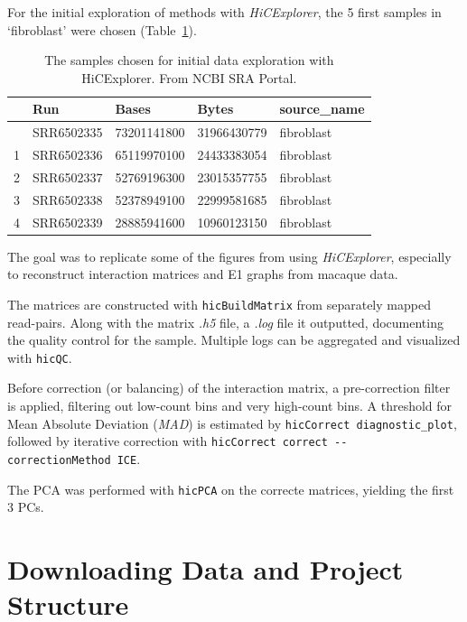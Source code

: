 \documentclass[
  11pt,
  a4paper,
]{scrbook}
\let\oldemph\emph
\renewcommand\emph[1]{\oldemph{\color{gray}#1}}
\begin{document}
For the initial exploration of methods with \emph{HiCExplorer}, the 5
first samples in `fibroblast' were chosen
(Table~\ref{tbl-hic-exploration}).

\small

\begin{longtable}[]{@{}lllll@{}}

\caption{\label{tbl-hic-exploration}The samples chosen for initial data
exploration with HiCExplorer. From NCBI SRA Portal.}

\tabularnewline

\toprule\noalign{}
& Run & Bases & Bytes & source\_name \\
\midrule\noalign{}
\endhead
\bottomrule\noalign{}
\endlastfoot
0 & SRR6502335 & 73201141800 & 31966430779 & fibroblast \\
1 & SRR6502336 & 65119970100 & 24433383054 & fibroblast \\
2 & SRR6502337 & 52769196300 & 23015357755 & fibroblast \\
3 & SRR6502338 & 52378949100 & 22999581685 & fibroblast \\
4 & SRR6502339 & 28885941600 & 10960123150 & fibroblast \\

\end{longtable}

\normalsize

The goal was to replicate some of the figures from
\citet{wang_reprogramming_2019} using \emph{HiCExplorer}, especially to
reconstruct interaction matrices and E1 graphs from macaque data.

The matrices are constructed with \texttt{hicBuildMatrix} from
separately mapped read-pairs. Along with the matrix \emph{.h5} file, a
\emph{.log} file it outputted, documenting the quality control for the
sample. Multiple logs can be aggregated and visualized with
\texttt{hicQC}.

Before correction (or balancing) of the interaction matrix, a
pre-correction filter is applied, filtering out low-count bins and very
high-count bins. A threshold for Mean Absolute Deviation (\emph{MAD}) is
estimated by \texttt{hicCorrect\ diagnostic\_plot}, followed by
iterative correction with
\texttt{hicCorrect\ correct\ -\/-correctionMethod\ ICE}.

The PCA was performed with \texttt{hicPCA} on the correcte matrices,
yielding the first 3 PCs.

\section{Downloading Data and Project
Structure}\label{downloading-data-and-project-structure}
\end{document}
